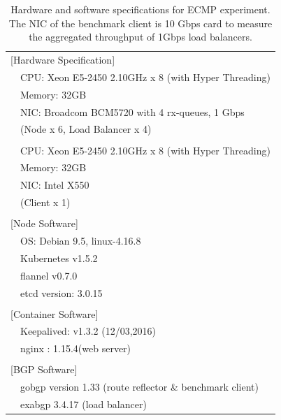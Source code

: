 {
\setlength{\tabcolsep}{1em}
\renewcommand{\arraystretch}{1.2}

\begin{table}[h]
  \centering
  \begin{tabular}{ll}
    \hline 
    \multicolumn{2}{l}{[Hardware Specification]}   \\
    & CPU: Xeon E5-2450 2.10GHz x 8 (with Hyper Threading) \\
    & Memory: 32GB \\
    & NIC: Broadcom BCM5720 with 4 rx-queues, 1 Gbps \\
    & (Node x 6, Load Balancer x 4) \\
    & \\
    & CPU: Xeon E5-2450 2.10GHz x 8 (with Hyper Threading) \\
    & Memory: 32GB \\
    & NIC: Intel X550 \\
    & (Client x 1) \\
    & \\
    \multicolumn{2}{l}{[Node Software]}  \\
    & OS: Debian 9.5, linux-4.16.8 \\
    & Kubernetes v1.5.2 \\
    & flannel v0.7.0 \\
    & etcd version: 3.0.15 \\
    & \\
    \multicolumn{2}{l}{[Container Software]}   \\
    & Keepalived: v1.3.2 (12/03,2016) \\
    & nginx : 1.15.4(web server) \\
    & \\
    \multicolumn{2}{l}{[BGP Software]}   \\
    & gobgp version 1.33 (route reflector \& benchmark client) \\
    & exabgp 3.4.17 (load balancer) \\
  \hline 
  \end{tabular}
  \par\bigskip
  \centering
  \begin{minipage}{0.9\columnwidth}
    \caption[Hardware and software specifications for ECMP experiment]{
      Hardware and software specifications for ECMP experiment.
      The NIC of the benchmark client is 10 Gbps card to measure the aggregated throughput of 1Gbps load balancers.
    }
    \label{tab:ecmp-hw_sw_spec}
  \end{minipage}
\end{table}
}

